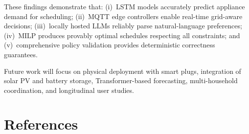 \documentclass[10pt,a4paper,twocolumn]{article}
\begin{document}
These findings demonstrate that: (i)~LSTM models accurately predict appliance demand for scheduling; (ii)~MQTT edge controllers enable real-time grid-aware decisions; (iii)~locally hosted LLMs reliably parse natural-language preferences; (iv)~MILP produces provably optimal schedules respecting all constraints; and (v)~comprehensive policy validation provides deterministic correctness guarantees.

Future work will focus on physical deployment with smart plugs, integration of solar PV and battery storage, Transformer-based forecasting, multi-household coordination, and longitudinal user studies.

\onecolumn
\section*{References}
\end{document}
